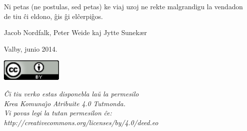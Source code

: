 {\frenchspacing
Ni petas (ne postulas, sed petas) ke viaj uzoj ne rekte malgrandigu la
vendadon de tiu \^ci eldono, \^gis \^gi el\^cerpi\^gos.}


{
Jacob Nordfalk, Peter Weide kaj Jytte Sunek{\ae}r}

{
Valby, junio 2014.}


\begin{center}
	\includegraphics[width=3cm]{permisilo.png}
\end{center}

\begin{center}
{\frenchspacing\itshape
\^Ci tiu verko estas disponebla la\u{u} la permesilo\\
Krea Komuna\^{\j}o Atribuite 4.0 Tutmonda.\\
Vi povas legi la tutan permesilon \^ce:\\
http://creativecommons.org/licenses/by/4.0/deed.eo}
\end{center}

